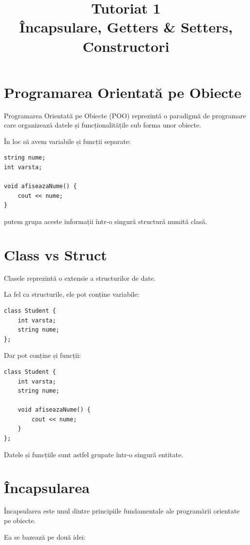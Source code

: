 \documentclass[12pt,a4paper]{article}
\title{\textbf{Tutoriat 1}\\Încapsulare, Getters \& Setters, Constructori}
\author{}
\date{}
\begin{document}
\maketitle

\section{Programarea Orientată pe Obiecte}

Programarea Orientată pe Obiecte (POO) reprezintă o paradigmă de programare care organizează datele și funcționalitățile sub forma unor obiecte.

În loc să avem variabile și funcții separate:

\begin{lstlisting}
string nume;
int varsta;

void afiseazaNume() {
    cout << nume;
}
\end{lstlisting}

putem grupa aceste informații într-o singură structură numită clasă.

\section{Class vs Struct}

Clasele reprezintă o extensie a structurilor de date.

La fel ca structurile, ele pot conține variabile:

\begin{lstlisting}
class Student {
    int varsta;
    string nume;
};
\end{lstlisting}

Dar pot conține și funcții:

\begin{lstlisting}
class Student {
    int varsta;
    string nume;

    void afiseazaNume() {
        cout << nume;
    }
};
\end{lstlisting}

Datele și funcțiile sunt astfel grupate într-o singură entitate.

\section{Încapsularea}

Încapsularea este unul dintre principiile fundamentale ale programării orientate pe obiecte.

Ea se bazează pe două idei:
\end{document}

